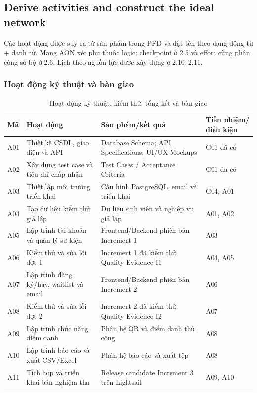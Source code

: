 \subsection{Derive activities and construct the ideal network}
Các hoạt động được suy ra từ sản phẩm trong PFD và đặt tên theo dạng động từ + danh từ. Mạng AON xét phụ thuộc logic; checkpoint ở 2.5 và effort cùng phân công sơ bộ ở 2.6. Lịch theo nguồn lực được xây dựng ở 2.10--2.11.
\subsubsection{Hoạt động kỹ thuật và bàn giao}
\begin{table}[H]
\centering
\caption{Hoạt động kỹ thuật, kiểm thử, tổng kết và bàn giao}
\footnotesize
\renewcommand{\arraystretch}{1.25}
\begin{tabularx}{\linewidth}{|p{0.8cm}|p{2.6cm}|>{\raggedright\arraybackslash}X|p{2.2cm}|}
\hline
\textbf{Mã} & \textbf{Hoạt động} & \textbf{Sản phẩm/kết quả} & \textbf{Tiền nhiệm/điều kiện} \\ \hline
A01 & Thiết kế CSDL, giao diện và API & Database Schema; API Specifications; UI/UX Mockups & G01 đã có \\ \hline
A02 & Xây dựng test case và tiêu chí chấp nhận & Test Cases / Acceptance Criteria & G01 đã có \\ \hline
A03 & Thiết lập môi trường triển khai & Cấu hình PostgreSQL, email và triển khai & G04, A01 \\ \hline
A04 & Tạo dữ liệu kiểm thử giả lập & Dữ liệu sinh viên và nghiệp vụ giả lập & A01, A02 \\ \hline
A05 & Lập trình tài khoản và quản lý sự kiện & Frontend/Backend phiên bản Increment 1 & A03 \\ \hline
A06 & Kiểm thử và sửa lỗi đợt 1 & Increment 1 đã kiểm thử; Quality Evidence I1 & A04, A05 \\ \hline
A07 & Lập trình đăng ký/hủy, waitlist và email & Frontend/Backend phiên bản Increment 2 & A06 \\ \hline
A08 & Kiểm thử và sửa lỗi đợt 2 & Increment 2 đã kiểm thử; Quality Evidence I2 & A07 \\ \hline
A09 & Lập trình chức năng điểm danh & Phân hệ QR và điểm danh thủ công & A08 \\ \hline
A10 & Lập trình báo cáo và xuất CSV/Excel & Phân hệ báo cáo và xuất tệp & A08 \\ \hline
A11 & Tích hợp và triển khai bản nghiệm thu & Release candidate Increment 3 trên Lightsail & A09, A10 \\ \hline

\end{tabularx}
\end{table}
